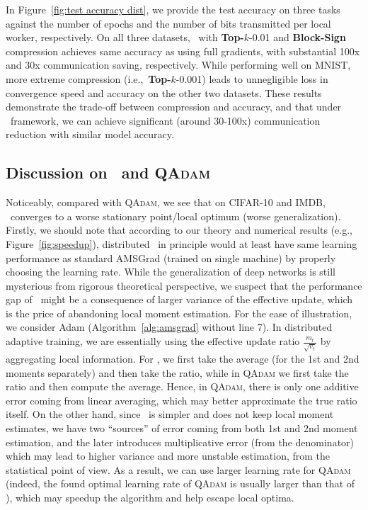 \documentclass[11pt]{article}
\begin{document}
In Figure~\ref{fig:test accuracy dist}, we provide the test accuracy on three tasks against the number of epochs and the number of bits transmitted per local worker, respectively. On all three datasets, \algo\ with \textbf{Top-$k$}-0.01 and \textbf{Block-Sign} compression achieves same accuracy as using full gradients, with substantial 100x and 30x communication saving, respectively. While performing well on MNIST, more extreme compression (i.e.,~\textbf{Top-$k$}-0.001) leads to unnegligible loss in convergence speed and accuracy on the other two datasets. These results demonstrate the trade-off between compression and accuracy, and that under \algo\ framework, we can achieve significant (around 30-100x) communication reduction with similar model accuracy.

\subsection{Discussion on \algo\ and \textsc{QAdam}}

Noticeably, compared with \textsc{QAdam}, we see that on CIFAR-10 and IMDB, \algo\ converges to a worse stationary point/local optimum (worse generalization). Firstly, we should note that according to our theory and numerical results (e.g., Figure~\ref{fig:speedup}), distributed \algo\ in principle would at least have same learning performance as standard AMSGrad (trained on single machine) by properly choosing the learning rate. While the generalization of deep networks is still mysterious from rigorous theoretical perspective, we suspect that the performance gap of \algo\ might be a consequence of larger variance of the effective update, which is the price of abandoning local moment estimation. For the ease of illustration, we consider Adam (Algorithm~\ref{alg:amsgrad} without line 7). In distributed adaptive training, we are essentially using the effective update ratio $\frac{m_t}{\sqrt{v_t}}$ by aggregating local information. For \algo, we first take the average (for the 1st and 2nd moments separately) and then take the ratio, while in \textsc{QAdam} we first take the ratio and then compute the average. Hence, in \textsc{QAdam}, there is only one additive error coming from linear averaging, which may better approximate the true ratio itself. On the other hand, since \algo\ is simpler and does not keep local moment estimates, we have two ``sources'' of error coming from both 1st and 2nd moment estimation, and the later introduces multiplicative error (from the denominator) which may lead to higher variance and more unstable estimation, from the statistical point of view. As a result, we can use larger learning rate for \textsc{QAdam} (indeed, the found optimal learning rate of \textsc{QAdam} is usually larger than that of \algo), which may speedup the algorithm and help escape local optima. 
\end{document}
